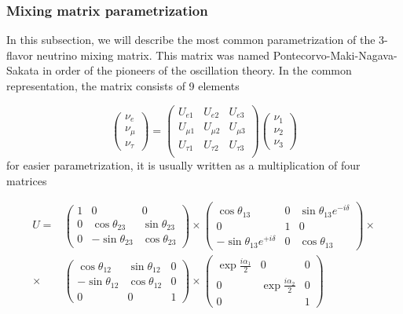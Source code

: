 \documentclass[../main.tex]{subfiles}
\begin{document}
\subsubsection{Mixing matrix parametrization}
In this subsection, we will describe the most common parametrization of the 3-flavor neutrino mixing matrix. This matrix was named Pontecorvo-Maki-Nagava-Sakata in order of the pioneers of the oscillation theory. In the common representation, the matrix consists of 9 elements

\begin{equation}
\begin{pmatrix}
\nu_e \\ \nu_\mu \\ \nu_\tau
\end{pmatrix}
=
\begin{pmatrix}
U_{e1} & U_{e2} & U_{e3} \\
U_{\mu 1} & U_{\mu 2} & U_{\mu 3} \\
U_{\tau 1} & U_{\tau 2} & U_{\tau 3} \\
\end{pmatrix}
\begin{pmatrix}
\nu_1 \\ \nu_2 \\ \nu_3
\end{pmatrix}
\end{equation}
for easier parametrization, it is usually written as a multiplication of four matrices

\begin{align}
\nonumber
U=&
\begin{pmatrix}
1   & 0                 & 0 \\
0   & \cos\theta_{23}   & \sin\theta_{23} \\
0   & -\sin\theta_{23}  & \cos\theta_{23}
\end{pmatrix}
\times
\begin{pmatrix}
\cos\theta_{13}                           & 0     & \sin\theta_{13}e^{-i\delta} \\
0                                         & 1     & 0 \\
-\sin\theta_{13}e^{+i\delta}              & 0     & \cos\theta_{13}
\end{pmatrix} \times \\
\times &
\begin{pmatrix}
\cos\theta_{12}   & \sin\theta_{12} & 0 \\
-\sin\theta_{12}  & \cos\theta_{12} & 0 \\
0                 & 0               & 1
\end{pmatrix}
\times
\begin{pmatrix}
\exp\frac{i\alpha_1}{2}   & 0                         & 0 \\
0                         & \exp\frac{i\alpha_2}{2}   & 0 \\
0                         &                           & 1
\end{pmatrix}
\label{eq:intro:osc_param}
\end{align}
\end{document}
